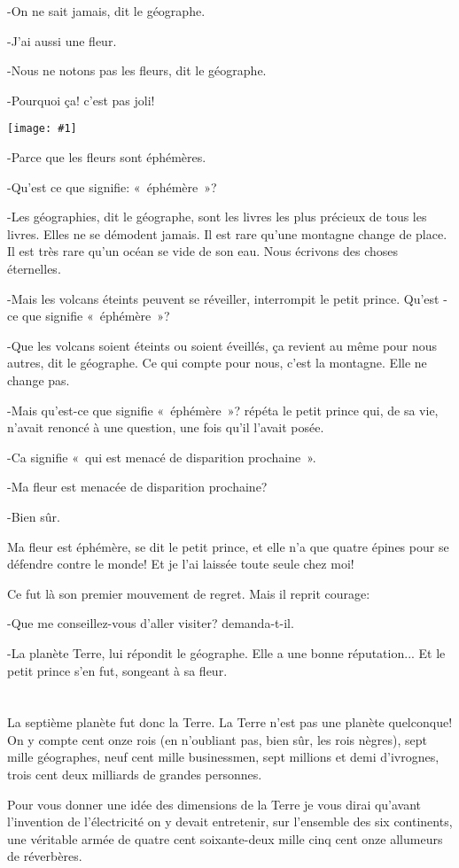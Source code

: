 \documentclass{report}
\newcommand{\parachapter}[2][]{\end{paracol}\chapter[#1]{#2}\begin{paracol}{2}}
\newcommand{\incpic}[1]{%
\end{paracol}
\begin{center}
    \texttt{[image: \#1]}
\end{center}
\begin{paracol}{2}}
\begin{document}
\begin{paracol}{2}
-On ne sait jamais, dit le géographe.

-J'ai aussi une fleur.

-Nous ne notons pas les fleurs, dit le géographe.

-Pourquoi ça! c'est pas joli!

\incpic{pic/image31.png}

-Parce que les fleurs sont éphémères.

-Qu'est ce que signifie: «~éphémère~»?

-Les géographies, dit le géographe, sont les livres les plus précieux de tous les livres. Elles ne se démodent jamais. Il est rare qu'une montagne change de place. Il est très rare qu'un océan se vide de son eau. Nous écrivons des choses éternelles.

-Mais les volcans éteints peuvent se réveiller, interrompit le petit prince. Qu'est -ce que signifie «~éphémère~»?

-Que les volcans soient éteints ou soient éveillés, ça revient au même pour nous autres, dit le géographe. Ce qui compte pour nous, c'est la montagne. Elle ne change pas.

-Mais qu'est-ce que signifie «~éphémère~»? répéta le petit prince qui, de sa vie, n'avait renoncé à une question, une fois qu'il l'avait posée.

-Ca signifie «~qui est menacé de disparition prochaine~».

-Ma fleur est menacée de disparition prochaine?

-Bien sûr.

Ma fleur est éphémère, se dit le petit prince, et elle n'a que quatre épines pour se défendre contre le monde! Et je l'ai laissée toute seule chez moi!

Ce fut là son premier mouvement de regret. Mais il reprit courage:

-Que me conseillez-vous d'aller visiter? demanda-t-il.

-La planète Terre, lui répondit le géographe. Elle a une bonne réputation...
Et le petit prince s'en fut, songeant à sa fleur.
\parachapter{} %
La septième planète fut donc la Terre.
La Terre n'est pas une planète quelconque! On y compte cent onze rois (en n'oubliant pas, bien sûr, les rois nègres), sept mille géographes, neuf cent mille businessmen, sept millions et demi d'ivrognes, trois cent deux milliards de grandes personnes.

Pour vous donner une idée des dimensions de la Terre je vous dirai qu'avant l'invention de l'électricité on y devait entretenir, sur l'ensemble des six continents, une véritable armée de quatre cent soixante-deux mille cinq cent onze allumeurs de réverbères.


\end{paracol}
\end{document}
